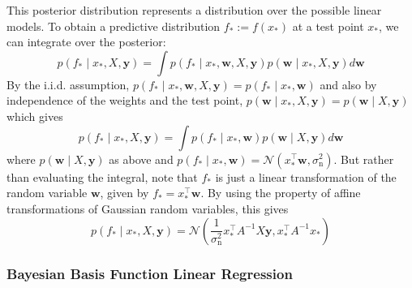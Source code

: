 \documentclass[11pt]{report} %
\begin{document}
This posterior distribution represents a distribution over the possible linear models. To obtain a predictive distribution $f_{*} := f\left(x_{*}\right)$ at a test point $x_{*}$, we can integrate over the posterior:
\begin{equation}
p\left(f_{*}\middle|x_{*},X,\mathbf{y}\right)=\int p\left(f_{*}\middle|x_{*},\mathbf{w},X,\mathbf{y}\right)p\left(\mathbf{w}\middle|x_{*},X,\mathbf{y}\right)d\mathbf{w}
\end{equation}
By the i.i.d. assumption, $p\left(f_{*}\middle|x_{*},\mathbf{w},X,\mathbf{y}\right) = p\left(f_{*}\middle|x_{*},\mathbf{w}\right)$ and also by independence of the weights and the test point, $p\left(\mathbf{w}\middle|x_{*},X,\mathbf{y}\right) = p\left(\mathbf{w}\middle|X,\mathbf{y}\right)$ which gives
\begin{equation}
p\left(f_{*}\middle|x_{*},X,\mathbf{y}\right)= \int p\left(f_{*}\middle|x_{*},\mathbf{w}\right)p\left(\mathbf{w}\middle|X,\mathbf{y}\right)d\mathbf{w}
\end{equation}
where $p\left(\mathbf{w}\middle|X,\mathbf{y}\right)$ as above and $p\left(f_{*}\middle|x_{*},\mathbf{w}\right) = \mathcal{N}\left(x_{*}^{\top}\mathbf{w}, \sigma_{\mathrm{n}}^{2}\right)$. But rather than evaluating the integral, note that $f_{*}$ is just a linear transformation of the random variable $\mathbf{w}$, given by $f_{*}=x_{*}^{\top}\mathbf{w}$. By using the property of affine transformations of Gaussian random variables, this gives
\begin{equation}
p\left(f_{*}\middle|x_{*},X,\mathbf{y}\right)=\mathcal{N}\left(\dfrac{1}{\sigma_{\mathrm{n}}^{2}}x_{*}^{\top}A^{-1}X\mathbf{y},x_{*}^{\top}A^{-1}x_{*}\right)
\end{equation}

\subsubsection{Bayesian Basis Function Linear Regression}
\end{document}
